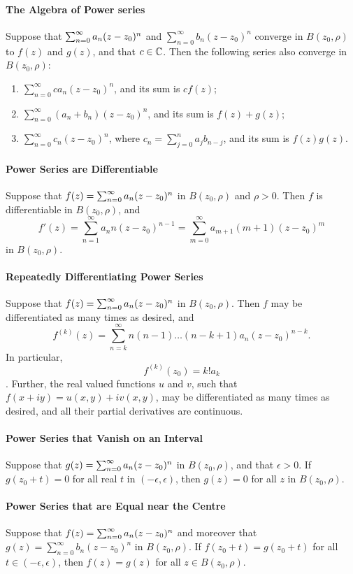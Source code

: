 \paragraph{The Algebra of Power series}
Suppose that \(\sum_{n=0}^{\infty} a_n(z - z_0)^n\) and \(\sum_{n=0}^{\infty} b_n(z - z_0)^n\) converge in \(B(z_0, \rho)\) to \(f(z)\) and \(g(z)\), and that \(c \in \mathbb{C}\). Then the following series also converge in \(B(z_0, \rho)\):
\begin{enumerate}[label=(\alph*)]
    \item \(\sum_{n=0}^{\infty} c a_n(z - z_0)^n\), and its sum is \(c f(z)\);
    \item \(\sum_{n=0}^{\infty} (a_n + b_n)(z - z_0)^n\), and its sum is \(f(z) + g(z)\);
    \item \(\sum_{n=0}^{\infty} c_n(z - z_0)^n\), where \(c_n = \sum_{j=0}^{n}a_jb_{n-j}\), and its sum is \(f(z)g(z)\).
\end{enumerate}

\paragraph{Power Series are Differentiable}
Suppose that \(f(z) = \sum_{n=0}^{\infty} a_n(z - z_0)^n\) in \(B(z_0, \rho)\) and \(\rho > 0\). Then \(f\) is differentiable in \(B(z_0, \rho)\), and
\[f'(z) = \sum_{n=1}^{\infty}a_n n(z - z_0)^{n-1} = \sum_{m=0}^{\infty} a_{m+1} (m+1)(z - z_0)^m\]
in \(B(z_0, \rho)\).

\paragraph{Repeatedly Differentiating Power Series}
Suppose that \(f(z) = \sum_{n=0}^{\infty} a_n(z - z_0)^n\) in \(B(z_0, \rho)\). Then \(f\) may be differentiated as many times as desired, and
\[f^{(k)}(z) = \sum_{n=k}^{\infty} n(n-1)\dots(n - k + 1)a_n(z - z_0)^{n - k}.\]
In particular,
\[f^{(k)}(z_0) = k!a_k\].
Further, the real valued functions \(u\) and \(v\), such that \(f(x + iy) = u(x,y) + iv(x, y)\), may be differentiated as many times as desired, and all their partial derivatives are continuous.

\paragraph{Power Series that Vanish on an Interval}
Suppose that \(g(z) = \sum_{n=0}^{\infty} a_n(z - z_0)^n\) in \(B(z_0, \rho)\), and that \(\epsilon > 0\). If \(g(z_0 + t) = 0\) for all real \(t\) in \((-\epsilon, \epsilon)\), then \(g(z) = 0\) for all \(z\) in \(B(z_0, \rho)\).

\paragraph{Power Series that are Equal near the Centre}
Suppose that \(f(z) = \sum_{n=0}^{\infty} a_n(z - z_0)^n\) and moreover that \(g(z) = \sum_{n=0}^{\infty} b_n(z - z_0)^n\) in \(B(z_0, \rho)\). If \(f(z_0 + t) = g(z_0 + t)\) for all \(t \in (-\epsilon, \epsilon)\), then \(f(z) = g(z)\) for all \(z \in B(z_0, \rho)\).